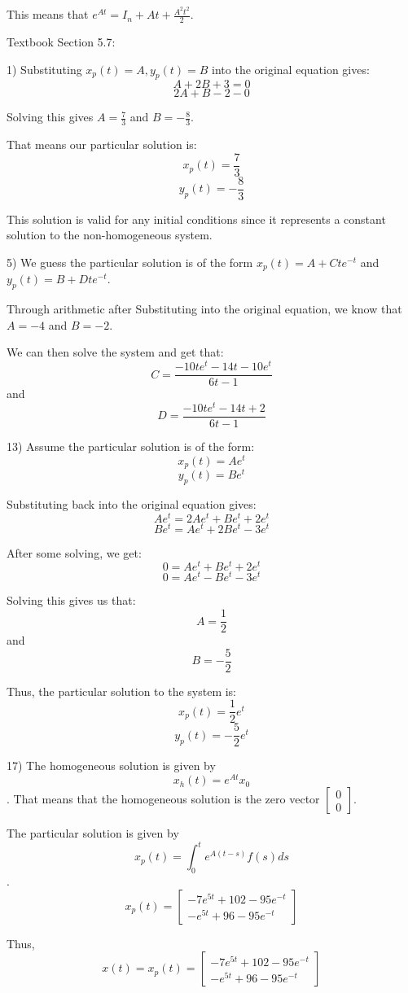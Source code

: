 \documentclass{article}
\begin{document}
This means that $e^{At} = I_n + At + \frac{A^2 t^2}{2}$.


Textbook Section 5.7:

1) Substituting $x_p(t) = A, y_p(t) = B$ into the original equation
gives:
\[A + 2B + 3 = 0\]
\[2A + B - 2 - 0\]

Solving this gives $A = \frac{7}{3}$
and $B = -\frac{8}{3}$.

That means our particular solution is:
\[x_p(t) = \frac{7}{3}\]
\[y_p(t) = -\frac{8}{3}\]

This solution is valid for any initial conditions since it represents
a constant solution to the non-homogeneous system.

5) We guess the particular solution
is of the form $x_p(t) = A + C t e^{-t}$
and $y_p(t) = B + D t e^{-t}$.

Through arithmetic after Substituting into the original equation,
we know that $A = -4$ and $B = -2$.

We can then solve the system and get that:
\[C = \frac{-10te^t - 14t - 10e^t}{6t - 1}\]
and
\[D = \frac{-10te^t - 14t + 2}{6t - 1}\]

13) Assume the particular solution is of the form:
\[x_p(t) = Ae^t\]
\[y_p(t) = Be^t\]

Substituting back into the original equation gives:
\[Ae^t = 2Ae^t + Be^t + 2e^t\]
\[Be^t = Ae^t + 2Be^t - 3e^t\]

After some solving, we get:
\[0 = Ae^t + Be^t + 2e^t\]
\[0 = Ae^t - Be^t - 3e^t\]

Solving this gives us that:
\[A = \frac{1}{2}\]
and
\[B = -\frac{5}{2}\]

Thus, the particular solution to the system is:
\[x_p(t) = \frac{1}{2} e^t\]
\[y_p(t) = -\frac{5}{2} e^t\]

17) The homogeneous solution is given by
\[x_h(t) = e^{At} x_0\].
That means that the homogeneous solution
is the zero vector $\begin{bmatrix}
    0 \\
    0
\end{bmatrix}$.

The particular solution is given by
\[x_p(t) = \int_{0}^{t} e^{A(t-s)} f(s) ds\].
\[x_p(t) = \begin{bmatrix}
    -7 e^{5t} + 102 - 95 e^{-t} \\
    -e^{5t} + 96 - 95 e^{-t}
\end{bmatrix}\]

Thus,
\[x(t) = x_p(t) = \begin{bmatrix}
    -7 e^{5t} + 102 - 95 e^{-t} \\
    -e^{5t} + 96 - 95 e^{-t}
\end{bmatrix}\]
\end{document}
